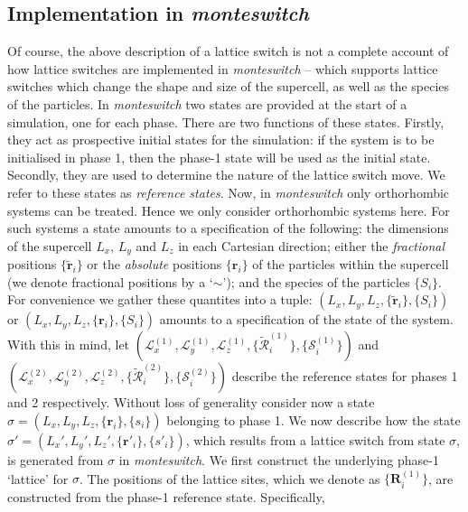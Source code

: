 \documentclass{report}
\begin{document}
\subsection{Implementation in \emph{monteswitch}}
Of course, the above description of a lattice switch is not a complete account of how lattice switches are implemented in \emph{monteswitch} -- which
supports lattice switches which change the shape and size of the supercell, as well as the species of the particles.
%
In \emph{monteswitch} two states are provided at the start of a simulation, one for each phase. There are two functions of these states. Firstly, they 
act as prospective initial states for the simulation: if the system is to be initialised in phase 1, then the phase-1 state will be used as the initial state.
Secondly, they are used to determine the nature of the lattice switch move. We refer to these states as \emph{reference states}.
Now, in \emph{monteswitch} only orthorhombic systems can be treated. Hence we only consider orthorhombic systems here. For such systems a state 
amounts to a specification of the following: the dimensions of the supercell $L_x$, $L_y$ and $L_z$ in each Cartesian direction; either the \emph{fractional} 
positions $\lbrace\tilde{\mathbf{r}}_i\rbrace$ or the \emph{absolute} positions $\lbrace\mathbf{r}_i\rbrace$ of the particles within the supercell
(we denote fractional positions by a `$\sim$'); and the species of the particles $\lbrace S_i\rbrace$. For convenience we gather these quantites into
a tuple: $(L_x,L_y,L_z,\lbrace\tilde{\mathbf{r}}_i\rbrace,\lbrace S_i\rbrace)$ or $(L_x,L_y,L_z,\lbrace\mathbf{r}_i\rbrace,\lbrace S_i\rbrace)$ amounts to
a specification of the state of the system. With this in mind, let 
$(\mathcal{L}^{(1)}_x,\mathcal{L}^{(1)}_y,\mathcal{L}^{(1)}_z,\lbrace\tilde{\mathcal{R}}^{(1)}_i\rbrace,\lbrace\mathcal{S}^{(1)}_i\rbrace)$ and
$(\mathcal{L}^{(2)}_x,\mathcal{L}^{(2)}_y,\mathcal{L}^{(2)}_z,\lbrace\tilde{\mathcal{R}}^{(2)}_i\rbrace,\lbrace\mathcal{S}^{(2)}_i\rbrace)$ describe
the reference states for phases 1 and 2 respectively.
Without loss of generality consider now a state $\sigma=(L_x,L_y,L_z,\lbrace\mathbf{r}_i\rbrace,\lbrace s_i\rbrace)$ belonging to phase 1.
We now describe how the state $\sigma'=(L_x',L_y',L_z',\lbrace\mathbf{r}'_i\rbrace,\lbrace s'_i\rbrace)$, which results from a lattice switch from
state $\sigma$, is generated from $\sigma$ in \emph{monteswitch}. We first construct the underlying phase-1 `lattice' for $\sigma$.
The positions of the lattice sites, which we denote as $\lbrace\mathbf{R}^{(1)}_i\rbrace$, are constructed from the phase-1 reference state. Specifically, 
\end{document}
